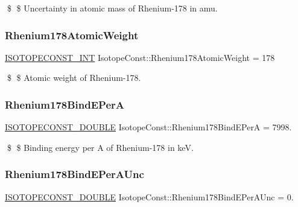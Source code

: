 \$ \$ Uncertainty in atomic mass of Rhenium-\/178 in amu. \mbox{\label{group___isotope_const-_rhenium-_re178_ga3ae407332220081c5ae2e26d67fc500e}} 
\subsubsection{\texorpdfstring{Rhenium178\+Atomic\+Weight}{Rhenium178AtomicWeight}}
{\footnotesize\ttfamily \mbox{\hyperlink{group___isotope_const-_macros_ga5f18360b3e99483a35c32d789e62621c}{I\+S\+O\+T\+O\+P\+E\+C\+O\+N\+S\+T\+\_\+\+I\+NT}} Isotope\+Const\+::\+Rhenium178\+Atomic\+Weight = 178}

\$ \$ Atomic weight of Rhenium-\/178. \mbox{\label{group___isotope_const-_rhenium-_re178_ga991c02b96b7b90fd09d1bc620ea5332e}} 
\subsubsection{\texorpdfstring{Rhenium178\+Bind\+E\+PerA}{Rhenium178BindEPerA}}
{\footnotesize\ttfamily \mbox{\hyperlink{group___isotope_const-_macros_ga8f45a7272ce02c0b4c65c44636ed719a}{I\+S\+O\+T\+O\+P\+E\+C\+O\+N\+S\+T\+\_\+\+D\+O\+U\+B\+LE}} Isotope\+Const\+::\+Rhenium178\+Bind\+E\+PerA = 7998.}

\$ \$ Binding energy per A of Rhenium-\/178 in keV. \mbox{\label{group___isotope_const-_rhenium-_re178_gaa4046d1d96fd3dad9dd1c257983a3e68}} 
\subsubsection{\texorpdfstring{Rhenium178\+Bind\+E\+Per\+A\+Unc}{Rhenium178BindEPerAUnc}}
{\footnotesize\ttfamily \mbox{\hyperlink{group___isotope_const-_macros_ga8f45a7272ce02c0b4c65c44636ed719a}{I\+S\+O\+T\+O\+P\+E\+C\+O\+N\+S\+T\+\_\+\+D\+O\+U\+B\+LE}} Isotope\+Const\+::\+Rhenium178\+Bind\+E\+Per\+A\+Unc = 0.}

